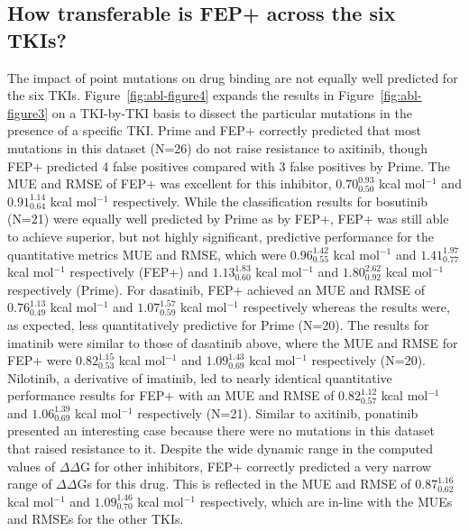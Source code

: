 \documentclass[phd,tocprelim]{cornell}
\begin{document}
\subsection{How transferable is FEP+ across the six TKIs?}
The impact of point mutations on drug binding are not equally well predicted for the six TKIs.
Figure~\ref{fig:abl-figure4} expands the results in Figure~\ref{fig:abl-figure3} on a TKI-by-TKI basis to dissect the particular mutations in the presence of a specific TKI.
Prime and FEP+ correctly predicted that most mutations in this dataset (N=26) do not raise resistance to axitinib, though FEP+ predicted 4 false positives compared with 3 false positives by Prime. The MUE and RMSE of FEP+ was excellent for this inhibitor, $0.70^{0.93}_{0.50}$ kcal mol$^{-1}$ and $0.91^{1.14}_{0.64}$ kcal mol$^{-1}$ respectively.
While the classification results for bosutinib (N=21) were equally well predicted by Prime as by FEP+, FEP+ was still able to achieve superior, but not highly significant, predictive performance for the quantitative metrics MUE and RMSE, which were $0.96^{1.42}_{0.55}$ kcal mol$^{-1}$ and $1.41^{1.97}_{0.77}$ kcal mol$^{-1}$ respectively (FEP+) and $1.13^{1.83}_{0.60}$ kcal mol$^{-1}$ and $1.80^{2.62}_{0.92}$ kcal mol$^{-1}$ respectively (Prime).
For dasatinib, FEP+ achieved an MUE and RMSE of $0.76^{1.13}_{0.49}$ kcal mol$^{-1}$ and $1.07^{1.57}_{0.59}$ kcal mol$^{-1}$ respectively whereas the results were, as expected, less quantitatively predictive for Prime (N=20).
The results for imatinib were similar to those of dasatinib above, where the MUE and RMSE for FEP+ were $0.82^{1.15}_{0.53}$ kcal mol$^{-1}$ and $1.09^{1.43}_{0.69}$ kcal mol$^{-1}$ respectively (N=20).
Nilotinib, a derivative of imatinib, led to nearly identical quantitative performance results for FEP+ with an MUE and RMSE of $0.82^{1.12}_{0.57}$ kcal mol$^{-1}$ and $1.06^{1.39}_{0.69}$ kcal mol$^{-1}$ respectively (N=21).
Similar to axitinib, ponatinib presented an interesting case because there were no mutations in this dataset that raised resistance to it.
Despite the wide dynamic range in the computed values of $\Delta\Delta$G for other inhibitors, FEP+ correctly predicted a very narrow range of $\Delta\Delta$Gs for this drug. 
This is reflected in the MUE and RMSE of $0.87^{1.16}_{0.62}$ kcal mol$^{-1}$ and $1.09^{1.46}_{0.70}$ kcal mol$^{-1}$ respectively, which are in-line with the MUEs and RMSEs for the other TKIs.
\end{document}
